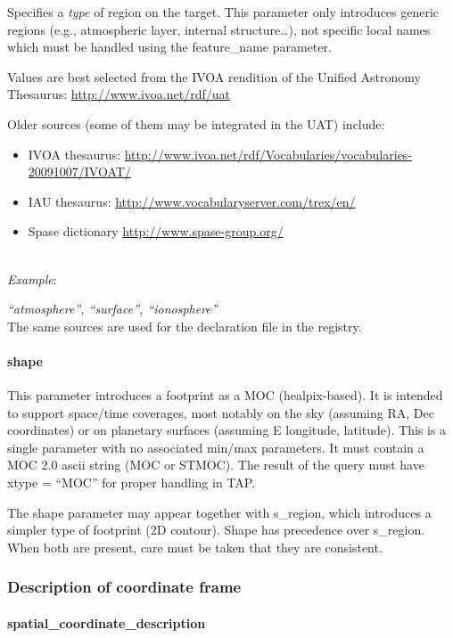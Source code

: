 \documentclass[11pt,a4paper]{ivoa}
\begin{document}
Specifies a \emph{type} of region on the target. This parameter
only introduces generic regions  (e.g., atmospheric layer, internal
structure…), not specific local names which must be handled using the
feature\_name parameter.

Values are best selected from the IVOA
rendition of the Unified Astronomy Thesaurus:
\url{http://www.ivoa.net/rdf/uat}

Older sources (some of them may be integrated in the UAT) include:

\begin{itemize}
\item IVOA thesaurus:
      \url{http://www.ivoa.net/rdf/Vocabularies/vocabularies-20091007/IVOAT/}
\item IAU thesaurus:
      \url{http://www.vocabularyserver.com/trex/en/}
\item Spase dictionary \url{http://www.spase-group.org/}
\end{itemize}

\textbf{\\}
\emph{Example}:

\emph{``atmosphere'', ``surface'', ``ionosphere''}\\
The same sources are used for the declaration file in the registry.

\paragraph{shape}

This parameter introduces a footprint as a MOC (healpix-based).
It is intended to support space/time coverages, most notably on the sky
(assuming RA, Dec coordinates) or on planetary surfaces (assuming
E longitude, latitude). This is a single parameter with no associated min/max
parameters. It must contain a MOC 2.0 ascii string (MOC or STMOC).
The result of the query must have xtype = ``MOC''
for proper handling in TAP.

The shape parameter may appear together with s\_region, which introduces
a simpler type of footprint (2D contour). Shape has precedence over
s\_region. When both are present, care must be taken that they are
consistent.

\subsubsection{Description of coordinate frame}

\paragraph{spatial\_coordinate\_description}
\end{document}
